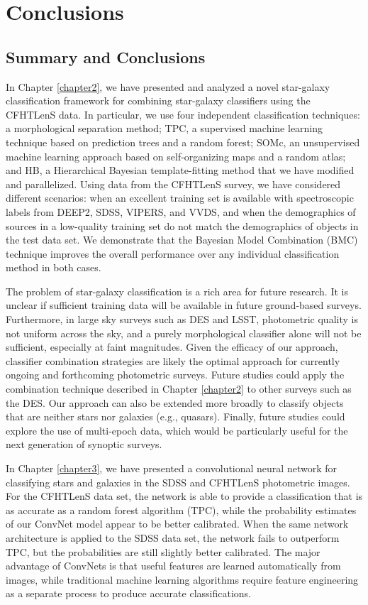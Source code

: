 \chapter{Conclusions}
  \label{chapter5}
 
\section{Summary and Conclusions}

In Chapter \ref{chapter2}, we have presented and analyzed a novel star-galaxy classification framework
for combining star-galaxy classifiers using the CFHTLenS data.
In particular, we use four independent classification techniques:
a morphological separation method;
TPC, a supervised machine learning technique
based on prediction trees and a random forest;
SOMc, an unsupervised machine learning approach
based on self-organizing maps and a random atlas;
and HB, a Hierarchical Bayesian template-fitting method
that we have modified and parallelized.
Using data from the CFHTLenS survey,
we have considered different scenarios:
when an excellent training set is available with spectroscopic labels from
DEEP2, SDSS, VIPERS, and VVDS, and
when the demographics of sources in a low-quality training set
do not match the demographics of objects in the test data set.
We demonstrate that the Bayesian Model Combination (BMC) technique improves
the overall performance over any individual classification method
in both cases.

The problem of star-galaxy classification is a rich area for future research. It is unclear
if sufficient training data will be available in future ground-based surveys. Furthermore, in
large sky surveys such as DES and LSST, photometric quality is not uniform across the
sky, and a purely morphological classifier alone will not be sufficient, especially at faint
magnitudes. Given the efficacy of our approach, classifier combination strategies are likely
the optimal approach for currently ongoing and forthcoming photometric surveys. Future
studies could apply the combination technique described in Chapter \ref{chapter2} to other surveys
such as the DES. Our approach can also be extended more broadly to classify objects that
are neither stars nor galaxies (e.g., quasars). Finally, future studies could explore the use
of multi-epoch data, which would be particularly useful for the next generation of synoptic
surveys.

In Chapter \ref{chapter3}, we have presented a convolutional neural network for classifying stars and
galaxies in the SDSS and CFHTLenS photometric images.
For the CFHTLenS data set, the network is able to provide a classification that
is as accurate as a random forest algorithm (TPC), while the probability estimates of
our ConvNet model appear to be better calibrated.
When the same network architecture is applied to the SDSS data set,
the network fails to outperform TPC,
but the probabilities are still slightly better calibrated.
The major advantage of ConvNets is that useful features are learned
automatically from images, while traditional machine learning
algorithms require feature engineering as a separate process
to produce accurate classifications.

